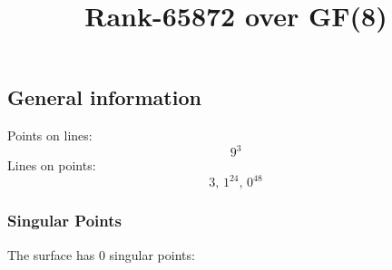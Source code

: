 \documentclass{article}
\newcommand\setTBstruts{\def\T{\rule{0pt}{2.6ex}}%
\def\B{\rule[-1.2ex]{0pt}{0pt}}}
\begin{document}
 
\setTBstruts



{\allowdisplaybreaks%






\title{Rank-65872 over GF(8)}
\author{}%
\maketitle%
%
{}



\subsection*{General information}
Points on lines:
$$
9^3$$
Lines on points:
$$
3,\,1^{24},\,0^{48}$$
\subsubsection*{Singular Points}
The surface has 0 singular points:\\
\begin{align*}
\end{align*}
}
\end{document}
